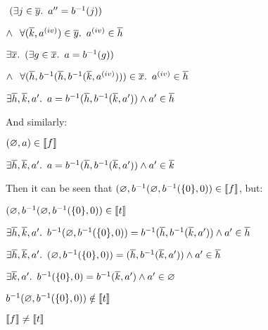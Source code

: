 \begin{itemize}
  \step
    \quad\quad\quad\phantom{$\land$}$~(\exists j\in\overline{y}\ldotp~a^{\prime\prime}=b^{-1}(j))$

  \step
    \quad\quad\quad$\land~\phantom{(}\forall (\overline{k},a^{\text (iv)})\in\overline{y}\ldotp~a^{\text (iv)}\in\overline{h}$
  \addtolength{\itemsep}{.2\baselineskip}

  \step[\iffs]
    $\exists \overline{x}\ldotp~(\exists g\in\overline{x}\ldotp~a = b^{-1}(g))$

  \addtolength{\itemsep}{-.2\baselineskip}
  \step
    \quad $\land~\phantom{(}\forall(\overline{h},b^{-1}(\overline{h},b^{-1}(\overline{k}, a^{\text (iv)})))\in\overline{x}\ldotp~a^{\text (iv)}\in\overline{h}$
  \addtolength{\itemsep}{.2\baselineskip}

  \step[\iffs]
    $\exists\overline{h},\overline{k},a^\prime\ldotp~a = b^{-1}(\overline{h}, b^{-1}(\overline{k},a^\prime))\land a^\prime\in\overline{h}$
\end{itemize}

And similarly:

\begin{itemize}
  \step
    $(\varnothing,a)\in\llbracket f \rrbracket$

  \step[\iffs]
    $\exists\overline{h},\overline{k},a^\prime\ldotp~a = b^{-1}(\overline{h}, b^{-1}(\overline{k},a^\prime))\land a^\prime\in\overline{k}$

\end{itemize}

Then it can be seen that $(\varnothing,b^{-1}(\varnothing,b^{-1}(\{0\},0))\in\llbracket f \rrbracket$, but:
\begin{itemize}
  \step
    $(\varnothing,b^{-1}(\varnothing,b^{-1}(\{0\},0))\in\llbracket t \rrbracket$

  \step[\iffs]
    $\exists\overline{h},\overline{k},a^\prime\ldotp~b^{-1}(\varnothing,b^{-1}(\{0\},0)) = b^{-1}(\overline{h}, b^{-1}(\overline{k},a^\prime))\land a^\prime\in\overline{h}$

  \step[\iffs]
    $\exists\overline{h},\overline{k},a^\prime\ldotp~(\varnothing,b^{-1}(\{0\},0)) = (\overline{h}, b^{-1}(\overline{k},a^\prime))\land a^\prime\in\overline{h}$

  \step[\iffs]
    $\exists\overline{k},a^\prime\ldotp~b^{-1}(\{0\},0) = b^{-1}(\overline{k},a^\prime)\land a^\prime\in\varnothing$

  \step[\imps]
    $b^{-1}(\varnothing,b^{-1}(\{0\},0))\notin\llbracket t \rrbracket$

  \step[\imps]
    $\llbracket f \rrbracket\neq\llbracket t \rrbracket$
\end{itemize}
